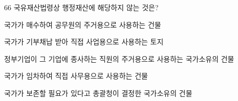 \begin{question}{66}
국유재산법령상 행정재산에 해당하지 않는 것은?
\begin{choices}
  \item 국가가 매수하여 공무원의 주거용으로 사용하는 건물
  \item 국가가 기부채납 받아 직접 사업용으로 사용하는 토지
  \item 정부기업이 그 기업에 종사하는 직원의 주거용으로 사용하는 국가소유의 건물
  \item 국가가 임차하여 직접 사무용으로 사용하는 건물
  \item 국가가 보존할 필요가 있다고 총괄청이 결정한 국가소유의 건물
\end{choices}
\end{question}
